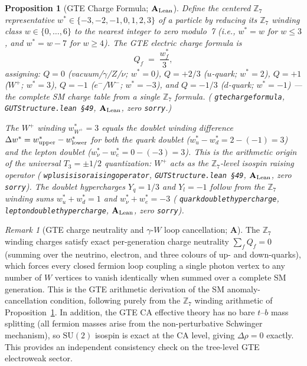 \documentclass[11pt]{article}
\newtheorem{proposition}[theorem]{Proposition}
\theoremstyle{remark}
\newtheorem{remark}[theorem]{Remark}
\newcommand{\ZS}{\mathbb{Z}_7}
\newcommand{\lean}[1]{%
  \penalty-100
  \begingroup\def\_{\textunderscore\allowbreak}\texttt{#1}\endgroup}
\newcommand{\CatA}{\textbf{A}}
\newcommand{\CatAL}{\ensuremath{\textbf{A}_{\rm Lean}}}
\begin{document}
\begin{proposition}[GTE Charge Formula; $\CatAL$]
\label{prop:charge_formula}
Define the \emph{centered} $\mathbb{Z}_7$ representative $w^* \in \{-3,-2,-1,0,1,2,3\}$
of a particle by reducing its $\mathbb{Z}_7$ winding class $w \in \{0,\ldots,6\}$ to the
nearest integer to zero modulo~7 (i.e., $w^* = w$ for $w \leq 3$, and $w^* = w - 7$
for $w \geq 4$).
The GTE electric charge formula is
\begin{equation}
  Q_f \;=\; \frac{w_f^*}{3},
  \label{eq:charge_formula}
\end{equation}
assigning: $Q = 0$ (vacuum/$\gamma$/$Z$/$\nu$; $w^* = 0$), $Q = +2/3$ ($u$-quark;
$w^* = 2$), $Q = +1$ ($W^+$; $w^* = 3$), $Q = -1$ ($e^-$/$W^-$; $w^* = -3$), and
$Q = -1/3$ ($d$-quark; $w^* = -1$) --- the complete SM charge table from a single
$\mathbb{Z}_7$ formula.
(\lean{gte\_charge\_formula}, \texttt{GUTStructure.lean~\S49}, $\CatAL$,
zero \texttt{sorry}.)

The $W^+$ winding $w_{W^+}^* = 3$ equals the doublet winding difference
$\Delta w^* = w_{\rm upper}^* - w_{\rm lower}^*$ for both the quark doublet
($w_u^* - w_d^* = 2 - (-1) = 3$) and the lepton doublet
($w_\nu^* - w_e^* = 0 - (-3) = 3$).
This is the arithmetic origin of the universal $T_3 = \pm 1/2$ quantization: $W^+$
acts as the $\mathbb{Z}_7$-level isospin raising operator
(\lean{wplus\_is\_iso\_raising\_operator}, \texttt{GUTStructure.lean~\S49}, $\CatAL$,
zero \texttt{sorry}).
The doublet hypercharges $Y_q = 1/3$ and $Y_l = -1$ follow from the $\mathbb{Z}_7$
winding sums $w_u^* + w_d^* = 1$ and $w_\nu^* + w_e^* = -3$
(\lean{quark\_doublet\_hypercharge}, \lean{lepton\_doublet\_hypercharge},
$\CatAL$, zero \texttt{sorry}).
\end{proposition}

\begin{remark}[GTE charge neutrality and $\gamma$-$W$ loop cancellation; $\CatA$]
\label{rem:charge_neutrality}
The $\ZS$ winding charges satisfy exact per-generation charge neutrality
$\sum_f Q_f = 0$ (summing over the neutrino, electron, and three colours of
up- and down-quarks), which forces every closed fermion loop coupling a single
photon vertex to any number of $W$ vertices to vanish identically when summed
over a complete SM generation.  This is the GTE arithmetic derivation of the
SM anomaly-cancellation condition, following purely from the $\ZS$ winding
arithmetic of Proposition~\ref{prop:charge_formula}.
In addition, the GTE CA effective theory has no bare $t$--$b$ mass splitting
(all fermion masses arise from the non-perturbative Schwinger mechanism), so
$\mathrm{SU}(2)$ isospin is exact at the CA level, giving $\Delta\rho = 0$
exactly.  This provides an independent consistency check on the tree-level GTE
electroweak sector.
\end{remark}
\end{document}
